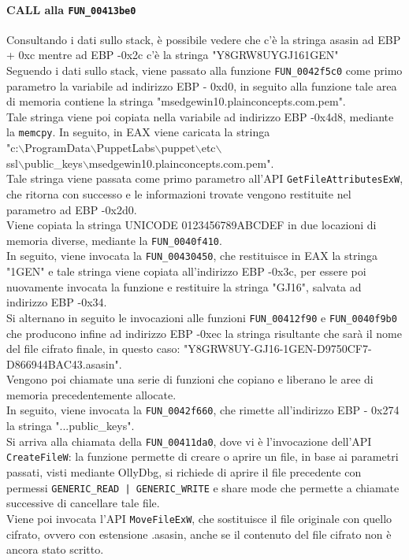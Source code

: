 \documentclass[12pt]{extarticle}
\begin{document}
\paragraph{CALL alla \texttt{FUN\_00413be0}} Consultando i dati sullo stack, è possibile vedere che c'è la stringa asasin ad EBP + 0xc mentre ad EBP -0x2c c'è la stringa "Y8GRW8UYGJ161GEN"\\Seguendo i dati sullo stack, viene passato alla funzione \texttt{FUN\_0042f5c0} come primo parametro la variabile ad indirizzo EBP - 0xd0, in seguito alla funzione tale area di memoria contiene la stringa "msedgewin10.plainconcepts.com.pem".\\Tale stringa viene poi copiata nella variabile ad indirizzo EBP -0x4d8, mediante la \texttt{memcpy}. In seguito, in EAX viene caricata la stringa \\"c:$\backslash$ProgramData$\backslash$PuppetLabs$\backslash$puppet$\backslash$etc$\backslash$\\ssl$\backslash$public\_keys$\backslash$msedgewin10.plainconcepts.com.pem".\\Tale stringa viene passata come primo parametro all'API \texttt{GetFileAttributesExW}, che ritorna con successo e le informazioni trovate vengono restituite nel parametro ad EBP -0x2d0.\\Viene copiata la stringa UNICODE 0123456789ABCDEF in due locazioni di memoria diverse,  mediante la \texttt{FUN\_0040f410}.\\In seguito, viene invocata la \texttt{FUN\_00430450}, che restituisce in EAX la stringa "1GEN" e tale stringa viene copiata all'indirizzo EBP -0x3c, per essere poi nuovamente invocata la funzione e restituire la stringa "GJ16", salvata ad indirizzo EBP -0x34.\\Si alternano in seguito le invocazioni alle funzioni \texttt{FUN\_00412f90} e \texttt{FUN\_0040f9b0} che producono infine ad indirizzo EBP -0xec la stringa risultante che sarà il nome del file cifrato finale, in questo caso: "Y8GRW8UY-GJ16-1GEN-D9750CF7-D866944BAC43.asasin".\\Vengono poi chiamate una serie di funzioni che copiano e liberano le aree di memoria precedentemente allocate.\\In seguito, viene invocata la \texttt{FUN\_0042f660}, che rimette all'indirizzo EBP - 0x274 la stringa "...public\_keys".\\Si arriva alla chiamata della \texttt{FUN\_00411da0}, dove vi è l'invocazione dell'API \texttt{CreateFileW}: la funzione permette di creare o aprire un file, in base ai parametri passati, visti mediante OllyDbg, si richiede di aprire il file precedente con permessi \texttt{GENERIC\_READ | GENERIC\_WRITE} e share mode che permette a chiamate successive di cancellare tale file.\\Viene poi invocata l'API \texttt{MoveFileExW}, che sostituisce il file originale con quello cifrato, ovvero con estensione .asasin, anche se il contenuto del file cifrato non è ancora stato scritto.\\\\
\end{document}
